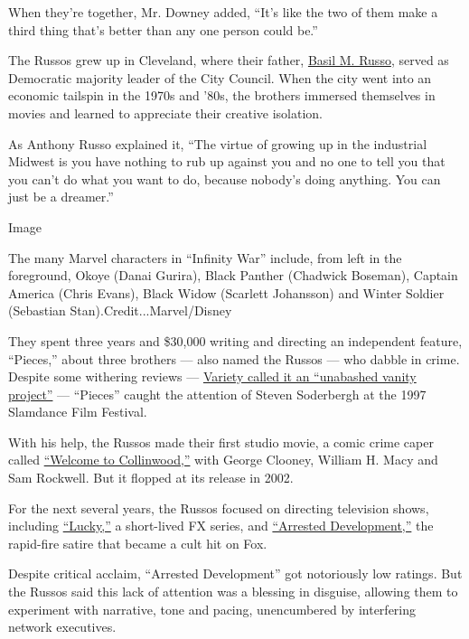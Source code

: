 When they're together, Mr. Downey added, ``It's like the two of them
make a third thing that's better than any one person could be.''

The Russos grew up in Cleveland, where their father,
\href{https://www.orderisda.org/about/officers/}{Basil M. Russo}, served
as Democratic majority leader of the City Council. When the city went
into an economic tailspin in the 1970s and '80s, the brothers immersed
themselves in movies and learned to appreciate their creative isolation.

As Anthony Russo explained it, ``The virtue of growing up in the
industrial Midwest is you have nothing to rub up against you and no one
to tell you that you can't do what you want to do, because nobody's
doing anything. You can just be a dreamer.''

Image

The many Marvel characters in ``Infinity War'' include, from left in the
foreground, Okoye (Danai Gurira), Black Panther (Chadwick Boseman),
Captain America (Chris Evans), Black Widow (Scarlett Johansson) and
Winter Soldier (Sebastian Stan).Credit...Marvel/Disney

They spent three years and \$30,000 writing and directing an independent
feature, ``Pieces,'' about three brothers --- also named the Russos ---
who dabble in crime. Despite some withering reviews ---
\href{http://variety.com/1997/film/reviews/pieces-1200452417/}{Variety
called it an ``unabashed vanity project''} --- ``Pieces'' caught the
attention of Steven Soderbergh at the 1997 Slamdance Film Festival.

With his help, the Russos made their first studio movie, a comic crime
caper called
\href{https://www.youtube.com/watch?v=59D5PnEBhXs}{``Welcome to
Collinwood,''} with George Clooney, William H. Macy and Sam Rockwell.
But it flopped at its release in 2002.

For the next several years, the Russos focused on directing television
shows, including
\href{https://www.youtube.com/watch?v=ftcigNUfrbs}{``Lucky,''} a
short-lived FX series, and
\href{https://www.youtube.com/watch?v=iuFXmh853TE}{``Arrested
Development,''} the rapid-fire satire that became a cult hit on Fox.

Despite critical acclaim, ``Arrested Development'' got notoriously low
ratings. But the Russos said this lack of attention was a blessing in
disguise, allowing them to experiment with narrative, tone and pacing,
unencumbered by interfering network executives.

